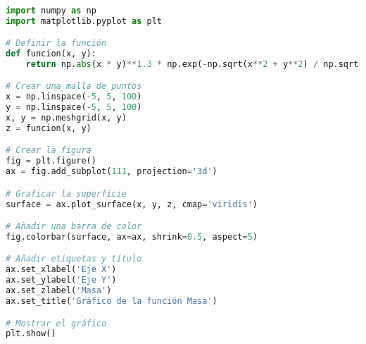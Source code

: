 \documentclass[12pt]{article}
\begin{document}
\begin{lstlisting}[language=Python, caption={Graficador de la Masa.}, style=mystyle]

import numpy as np
import matplotlib.pyplot as plt

# Definir la función
def funcion(x, y):
    return np.abs(x * y)**1.3 * np.exp(-np.sqrt(x**2 + y**2) / np.sqrt(2))

# Crear una malla de puntos
x = np.linspace(-5, 5, 100)
y = np.linspace(-5, 5, 100)
x, y = np.meshgrid(x, y)
z = funcion(x, y)

# Crear la figura
fig = plt.figure()
ax = fig.add_subplot(111, projection='3d')

# Graficar la superficie
surface = ax.plot_surface(x, y, z, cmap='viridis')

# Añadir una barra de color
fig.colorbar(surface, ax=ax, shrink=0.5, aspect=5)

# Añadir etiquetas y título
ax.set_xlabel('Eje X')
ax.set_ylabel('Eje Y')
ax.set_zlabel('Masa')
ax.set_title('Gráfico de la función Masa')

# Mostrar el gráfico
plt.show()
\end{lstlisting}
 
\end{document}
